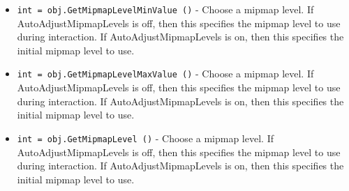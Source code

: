 \begin{itemize}
\item  \verb|int = obj.GetMipmapLevelMinValue ()| -  Choose a mipmap level. If AutoAdjustMipmapLevels is off, then this
 specifies the mipmap level to use during interaction. If
 AutoAdjustMipmapLevels is on, then this specifies the initial mipmap
 level to use.

\item  \verb|int = obj.GetMipmapLevelMaxValue ()| -  Choose a mipmap level. If AutoAdjustMipmapLevels is off, then this
 specifies the mipmap level to use during interaction. If
 AutoAdjustMipmapLevels is on, then this specifies the initial mipmap
 level to use.

\item  \verb|int = obj.GetMipmapLevel ()| -  Choose a mipmap level. If AutoAdjustMipmapLevels is off, then this
 specifies the mipmap level to use during interaction. If
 AutoAdjustMipmapLevels is on, then this specifies the initial mipmap
 level to use.

\end{itemize}
